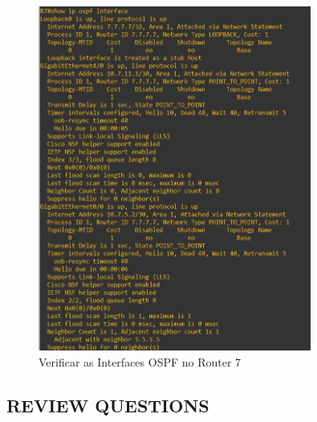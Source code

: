 \documentclass[11pt,english, openright, oneside]{book}
\begin{document}
\begin{itemize}
  \begin{figure}[H]
    \centering
    \includegraphics[width=0.80\textwidth]{imagens/Tarefa5/25.ospf_interface_R7.png}
    \caption{Verificar as Interfaces OSPF no Router 7}
    \label{fig:config45}
  \end{figure}
  \vspace{0.2cm}
\end{itemize}

\subsection{REVIEW QUESTIONS}
\vspace{0.2cm}
\end{document}
